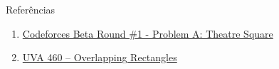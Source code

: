 \begin{frame}[fragile]{Referências}

    \begin{enumerate}
        \item \href{https://codeforces.com/problemset/problem/1/A}{Codeforces Beta Round \#1 - Problem A: Theatre Square}

        \item \href{https://uva.onlinejudge.org/index.php?option=com_onlinejudge&Itemid=8&page=show_problem&problem=401}{UVA 460 -- Overlapping Rectangles}

    \end{enumerate}

\end{frame}
